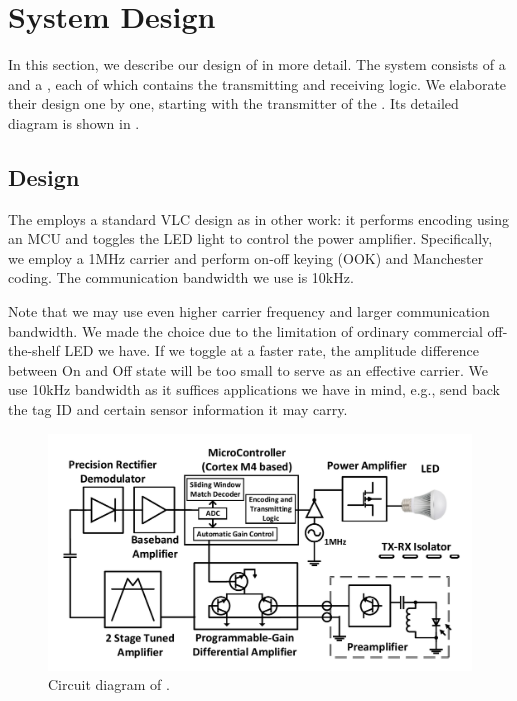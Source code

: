 \section{\retro System Design}\label{design}
In this section, we describe our design of \retro in more detail. The system consists of a \reader and a \vitag, each of which contains the transmitting and receiving logic. We elaborate their design one by one, starting with the transmitter of the \reader. Its detailed diagram is shown in .

\subsection{\readertx Design}
The \readertx employs a standard VLC design as in other work:  it performs encoding using an MCU and toggles the LED light to control the power amplifier. Specifically, we employ a 1MHz carrier and perform on-off keying (OOK) and Manchester coding. The communication bandwidth we use is 10kHz. 

Note that we may use even higher carrier frequency and larger communication bandwidth. We made the choice due to the limitation of ordinary commercial off-the-shelf LED we have. If we toggle at a faster rate, the amplitude difference between On and Off state will be too small to serve as an effective carrier. We use 10kHz bandwidth as it suffices applications we have in mind, e.g., send back the tag ID and certain sensor information it may carry.



\begin{figure}[!th]
\centering
\includegraphics[width=\columnwidth]{fig/read_diagram.pdf}
\vspace{-1em}
\caption{Circuit diagram of \reader. }
\label{fig:diagram_reader}
\end{figure}

